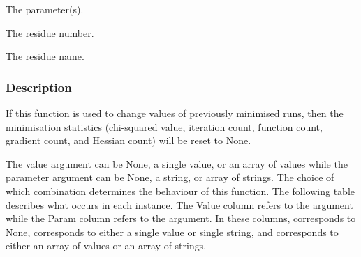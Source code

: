    The parameter(s).   

   The residue number.   

   The residue name.  

  

  
 \subsubsection{Description} 

 If this function is used to change values of previously minimised runs, then the minimisation statistics (chi-squared value, iteration count, function count, gradient count, and Hessian count) will be reset to None. 
  

 The value argument can be None, a single value, or an array of values while the parameter argument can be None, a string, or array of strings.  The choice of which combination determines the behaviour of this function.  The following table describes what occurs in each instance.  The Value column refers to the  argument while the Param column refers to the  argument.  In these columns,  corresponds to None,  corresponds to either a single value or single string, and  corresponds to either an array of values or an array of strings. 
  

